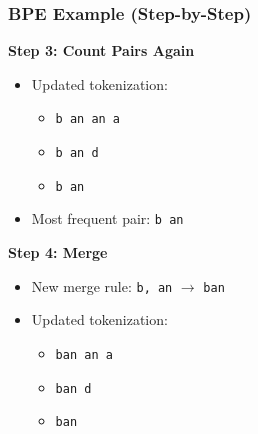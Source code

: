 \documentclass[usenames,dvipsnames,notes,11pt,aspectratio=169,hyperref={colorlinks=true, linkcolor=blue}]{beamer}
\begin{document}
\begin{frame}
\frametitle{BPE Example (Step-by-Step)}

\textbf{Step 3: Count Pairs Again}\\
\begin{itemize}
    \item Updated tokenization:
    \begin{itemize}
        \item \texttt{b an an a}
        \item \texttt{b an d}
        \item \texttt{b an}
    \end{itemize}
    \item Most frequent pair: \texttt{b an}
\end{itemize}

\textbf{Step 4: Merge}\\
\begin{itemize}
    \item New merge rule: \texttt{b,  an} $\rightarrow$ \texttt{ban}
    \item Updated tokenization:
    \begin{itemize}
        \item \texttt{ban an a}
        \item \texttt{ban d}
        \item \texttt{ban}
    \end{itemize}
\end{itemize}
\end{frame}

\end{document}
